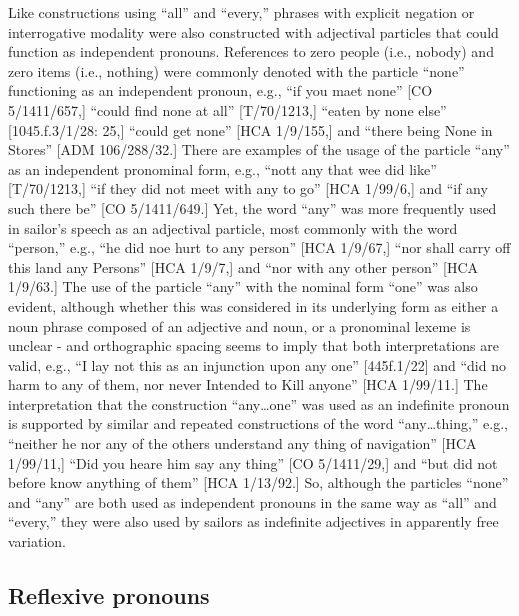   Like constructions using “all” and “every,” phrases with explicit negation or interrogative modality were also constructed with adjectival particles that could function as independent pronouns. References to zero people (i.e., nobody) and zero items (i.e., nothing) were commonly denoted with the particle “none” functioning as an independent pronoun, e.g., “if you maet none” [CO 5/1411/657,] “could find none at all” [T/70/1213,] “eaten by none else” [1045.f.3/1/28: 25,] “could get none” [HCA 1/9/155,] and “there being None in Stores” [ADM 106/288/32.] There are examples of the usage of the particle “any” as an independent pronominal form, e.g., “nott any that wee did like” [T/70/1213,] “if they did not meet with any to go” [HCA 1/99/6,] and “if any such there be” [CO 5/1411/649.] Yet, the word “any” was more frequently used in sailor’s speech as an adjectival particle, most commonly with the word “person,” e.g., “he did noe hurt to any person” [HCA 1/9/67,] “nor shall carry off this land any Persons” [HCA 1/9/7,] and “nor with any other person” [HCA 1/9/63.] The use of the particle “any” with the nominal form “one” was also evident, although whether this was considered in its underlying form as either a noun phrase composed of an adjective and noun, or a pronominal lexeme is unclear - and orthographic spacing seems to imply that both interpretations are valid, e.g., “I lay not this as an injunction upon any one” [445f.1/22] and “did no harm to any of them, nor never Intended to Kill anyone” [HCA 1/99/11.] The interpretation that the construction “any…one” was used as an indefinite pronoun is supported by similar and repeated constructions of the word “any…thing,” e.g., “neither he nor any of the others understand any thing of navigation” [HCA 1/99/11,] “Did you heare him say any thing” [CO 5/1411/29,] and “but did not before know anything of them” [HCA 1/13/92.] So, although the particles “none” and “any” are both used as independent pronouns in the same way as “all” and “every,” they were also used by sailors as indefinite adjectives in apparently free variation.

\subsection{\textbf{Reflexive} \textbf{pronouns}}%

